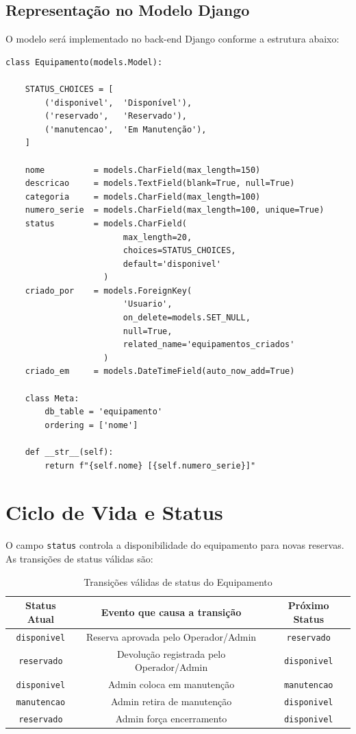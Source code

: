 \documentclass[12pt, a4paper]{article}
\begin{document}
\subsection{Representação no Modelo Django}

O modelo será implementado no back-end Django conforme a estrutura abaixo:

\begin{verbatim}
class Equipamento(models.Model):

    STATUS_CHOICES = [
        ('disponivel',  'Disponível'),
        ('reservado',   'Reservado'),
        ('manutencao',  'Em Manutenção'),
    ]

    nome          = models.CharField(max_length=150)
    descricao     = models.TextField(blank=True, null=True)
    categoria     = models.CharField(max_length=100)
    numero_serie  = models.CharField(max_length=100, unique=True)
    status        = models.CharField(
                        max_length=20,
                        choices=STATUS_CHOICES,
                        default='disponivel'
                    )
    criado_por    = models.ForeignKey(
                        'Usuario',
                        on_delete=models.SET_NULL,
                        null=True,
                        related_name='equipamentos_criados'
                    )
    criado_em     = models.DateTimeField(auto_now_add=True)

    class Meta:
        db_table = 'equipamento'
        ordering = ['nome']

    def __str__(self):
        return f"{self.nome} [{self.numero_serie}]"
\end{verbatim}

\section{Ciclo de Vida e Status}

O campo \texttt{status} controla a disponibilidade do equipamento para novas reservas.
As transições de status válidas são:

\begin{table}[H]
  \centering
  \begin{tabular}{ccc}
    \toprule
    \textbf{Status Atual} & \textbf{Evento que causa a transição} & \textbf{Próximo Status} \\
    \midrule
    \texttt{disponivel}  & Reserva aprovada pelo Operador/Admin  & \texttt{reservado}    \\
    \texttt{reservado}   & Devolução registrada pelo Operador/Admin & \texttt{disponivel} \\
    \texttt{disponivel}  & Admin coloca em manutenção            & \texttt{manutencao}   \\
    \texttt{manutencao}  & Admin retira de manutenção            & \texttt{disponivel}   \\
    \texttt{reservado}   & Admin força encerramento              & \texttt{disponivel}   \\
    \bottomrule
  \end{tabular}
  \caption{Transições válidas de status do Equipamento}
\end{table}
\end{document}
